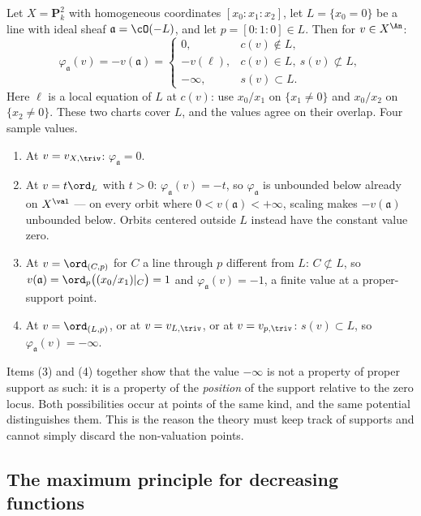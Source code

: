 \begin{example}
\label{ex:ch32-minus-infinity-p2}
Let $X=\mathbf P^2_k$ with homogeneous coordinates $[x_0:x_1:x_2]$, let
$L=\{x_0=0\}$ be a line with ideal sheaf $\mathfrak a=\cO(-L)$, and let
$p=[0:1:0]\in L$.  Then for $v\in X^{\An}$:
\[
 \varphi_{\mathfrak a}(v)=-v(\mathfrak a)=
 \begin{cases}
 0,&c(v)\notin L,\\
 -v(\ell),&c(v)\in L,\ s(v)\not\subset L,\\
 -\infty,&s(v)\subset L .
 \end{cases}
\]
Here $\ell$ is a local equation of $L$ at $c(v)$: use $x_0/x_1$
on $\{x_1\neq0\}$ and $x_0/x_2$ on $\{x_2\neq0\}$.  These two charts
cover $L$, and the values agree on their overlap.  Four sample values.
\begin{enumerate}
\item At $v=v_{X,\triv}$: $\varphi_{\mathfrak a}=0$.
\item At $v=t\ord_L$ with $t>0$: $\varphi_{\mathfrak a}(v)=-t$, so
$\varphi_{\mathfrak a}$ is unbounded below already on $X^{\val}$ --- on every orbit where $0<v(\mathfrak a)<+\infty$, scaling makes
$-v(\mathfrak a)$ unbounded below.  Orbits centered outside $L$ instead
have the constant value zero.
\item At $v=\ord_{(C,p)}$ for $C$ a line through $p$ different from
$L$: $C\not\subset L$, so $v(\mathfrak a)=\ord_p\bigl((x_0/x_1)|_C\bigr)
=1$ and $\varphi_{\mathfrak a}(v)=-1$, a finite value at a
proper-support point.
\item At $v=\ord_{(L,p)}$, or at $v=v_{L,\triv}$, or at
$v=v_{p,\triv}$: $s(v)\subset L$, so
$\varphi_{\mathfrak a}(v)=-\infty$.
\end{enumerate}
Items (3) and (4) together show that the value $-\infty$ is not a property
of proper support as such: it is a property of the \emph{position} of the
support relative to the zero locus.  Both possibilities occur at points of
the same kind, and the same potential distinguishes them.  This is the reason
the theory must keep track of supports and cannot simply discard the
non-valuation points.
\end{example}

\subsection{The maximum principle for decreasing functions}
\label{sec:ch32-maximum-principle}

